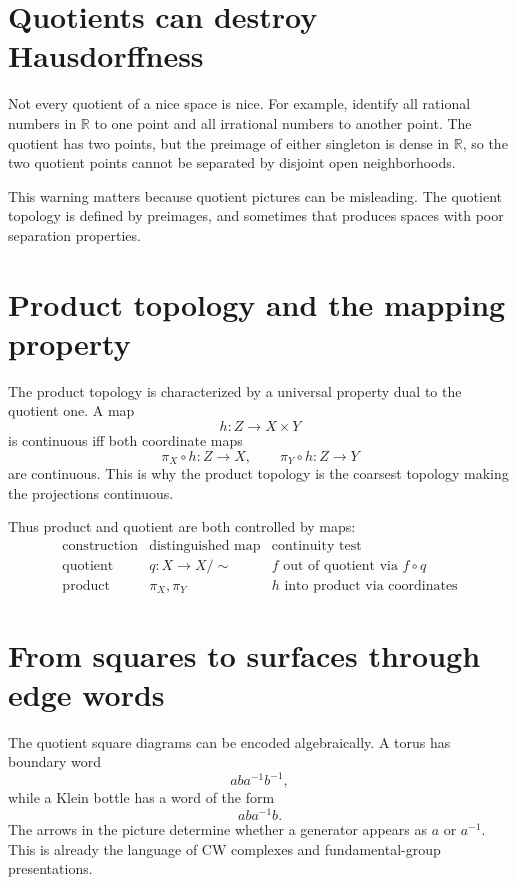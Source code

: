 \section{Quotients can destroy Hausdorffness}

Not every quotient of a nice space is nice.  For example, identify all rational numbers in \(\mathbb R\) to one point and all irrational numbers to another point.  The quotient has two points, but the preimage of either singleton is dense in \(\mathbb R\), so the two quotient points cannot be separated by disjoint open neighborhoods.

This warning matters because quotient pictures can be misleading.  The quotient topology is defined by preimages, and sometimes that produces spaces with poor separation properties.

\section{Product topology and the mapping property}

The product topology is characterized by a universal property dual to the quotient one.  A map
\[
  h:Z\to X\times Y
\]
is continuous iff both coordinate maps
\[
  \pi_X\circ h:Z\to X,\qquad \pi_Y\circ h:Z\to Y
\]
are continuous.  This is why the product topology is the coarsest topology making the projections continuous.

Thus product and quotient are both controlled by maps:
\[
\begin{array}{c|c|c}
\text{construction} & \text{distinguished map} & \text{continuity test}\\
\hline
\text{quotient} & q:X\to X/{\sim} & f\text{ out of quotient via }f\circ q\\
\text{product} & \pi_X,\pi_Y & h\text{ into product via coordinates}
\end{array}
\]

\section{From squares to surfaces through edge words}

The quotient square diagrams can be encoded algebraically.  A torus has boundary word
\[
  aba^{-1}b^{-1},
\]
while a Klein bottle has a word of the form
\[
  aba^{-1}b.
\]
The arrows in the picture determine whether a generator appears as \(a\) or \(a^{-1}\).  This is already the language of CW complexes and fundamental-group presentations.

